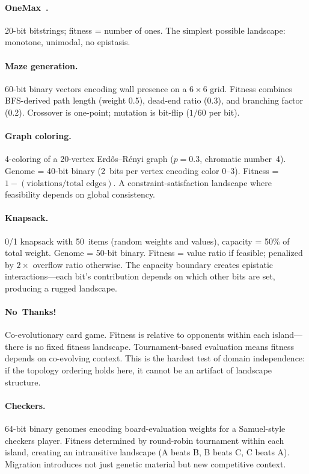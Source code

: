 \documentclass[dvipsnames,format=sigconf,anonymous=false,review=false]{acmart}
\begin{document}
\paragraph{OneMax~\cite{mitchell1992royal}.}
20-bit bitstrings; fitness = number of ones. The simplest possible landscape: monotone, unimodal, no epistasis.

\paragraph{Maze generation.}
60-bit binary vectors encoding wall presence on a $6 \times 6$ grid. Fitness combines BFS-derived path length (weight 0.5), dead-end ratio (0.3), and branching factor (0.2). Crossover is one-point; mutation is bit-flip ($1/60$ per bit).

\paragraph{Graph coloring.}
4-coloring of a 20-vertex Erd\H{o}s--R\'{e}nyi graph ($p = 0.3$, chromatic number~4). Genome = 40-bit binary (2~bits per vertex encoding color 0--3). Fitness = $1 - (\text{violations}/\text{total edges})$. A constraint-satisfaction landscape where feasibility depends on global consistency.

\paragraph{Knapsack.}
0/1 knapsack with 50~items (random weights and values), capacity = 50\% of total weight. Genome = 50-bit binary. Fitness = value ratio if feasible; penalized by $2\times$ overflow ratio otherwise. The capacity boundary creates epistatic interactions---each bit's contribution depends on which other bits are set, producing a rugged landscape.

\paragraph{No~Thanks!}
Co-evolutionary card game. Fitness is relative to opponents within each island---there is no fixed fitness landscape. Tournament-based evaluation means fitness depends on co-evolving context. This is the hardest test of domain independence: if the topology ordering holds here, it cannot be an artifact of landscape structure.

\paragraph{Checkers.}
64-bit binary genomes encoding board-evaluation weights for a Samuel-style~\cite{samuel1959checkers} checkers player. Fitness determined by round-robin tournament within each island, creating an intransitive landscape (A beats B, B beats C, C beats A). Migration introduces not just genetic material but new competitive context.
\end{document}
